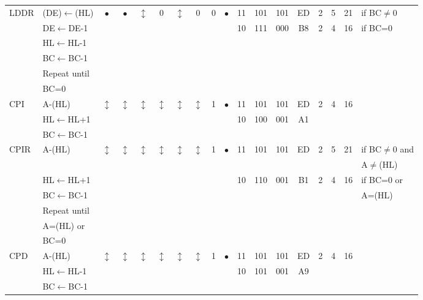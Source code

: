 \documentclass[oneside,a4paper]{book}
\begin{document}
{\begin{tabular}{llc@{ }c@{ }c@{ }c@{ }c@{ }c@{ }c@{ }cc@{ }c@{ }cccccll}
LDDR & (DE)$\leftarrow$(HL) & 
	$\bullet$ & $\bullet$ & $\updownarrow$\footnotemark[4] & 0 & $\updownarrow$\footnotemark[4] & 0\footnotemark[2] & 0 & $\bullet$ & 11 & 101 & 101
	& ED & 2 & 5 & 21 & \multicolumn{2}{l}{if BC$\not=$0} \\ 
	& DE$\leftarrow$DE-1 & \multicolumn{8}{c}{} & 10 & 111 & 000 & B8 & 2 & 4 & 16 & \multicolumn{2}{l}{if BC=0} \\
	& HL$\leftarrow$HL-1 & \multicolumn{15}{c}{} & & \\
	& BC$\leftarrow$BC-1 & \multicolumn{15}{c}{} & & \\ 
	& Repeat until& \multicolumn{15}{c}{} & & \\ 
	& BC=0 & \multicolumn{15}{c}{} & & \\ 

CPI & A-(HL) &
	$\updownarrow$\footnotemark[4] & $\updownarrow$\footnotemark[3] & $\updownarrow$\footnotemark[4] & $\updownarrow$\footnotemark[4] 
	& $\updownarrow$\footnotemark[4] & $\updownarrow$\footnotemark[1] & 1 & $\bullet$ & 11 & 101 & 101
	& ED & 2 & 4 & 16 & & \\ 
	& HL$\leftarrow$HL+1 & \multicolumn{8}{c}{} & 10 & 100 & 001 & A1 & \multicolumn{3}{c}{} & & \\ 
	& BC$\leftarrow$BC-1 & \multicolumn{15}{c}{} & & \\ 

CPIR & A-(HL) &
	$\updownarrow$\footnotemark[4] & $\updownarrow$\footnotemark[3] & $\updownarrow$\footnotemark[4] & $\updownarrow$\footnotemark[4] 
	& $\updownarrow$\footnotemark[4] & $\updownarrow$\footnotemark[1] & 1 & $\bullet$ & 11 & 101 & 101
	& ED & 2 & 5 & 21 & \multicolumn{2}{l}{if BC$\not=$0 and}  \\ 
 \multicolumn{17}{c}{} & \multicolumn{2}{l}{A$\not=$(HL)}  \\
	& HL$\leftarrow$HL+1 & \multicolumn{8}{c}{} & 10 & 110 & 001 & B1 & 2 & 4 & 16 & \multicolumn{2}{l}{if BC=0 or} \\
	& BC$\leftarrow$BC-1 & \multicolumn{15}{c}{} & \multicolumn{2}{l}{A=(HL)} \\ 
	& Repeat until& \multicolumn{15}{c}{} & & \\ 
	& A=(HL) or & \multicolumn{15}{c}{} & & \\ 
	& BC=0 & \multicolumn{15}{c}{} & & \\ 

CPD & A-(HL) &
	$\updownarrow$\footnotemark[4] & $\updownarrow$\footnotemark[3] & $\updownarrow$\footnotemark[4] & $\updownarrow$\footnotemark[4] 
	& $\updownarrow$\footnotemark[4] & $\updownarrow$\footnotemark[1] & 1 & $\bullet$ & 11 & 101 & 101
	& ED & 2 & 4 & 16 & & \\ 
	& HL$\leftarrow$HL-1 & \multicolumn{8}{c}{} & 10 & 101 & 001 & A9 & \multicolumn{3}{c}{} & & \\ 
	& BC$\leftarrow$BC-1 & \multicolumn{15}{c}{} & & \\ 


\end{tabular}}
\end{document}
